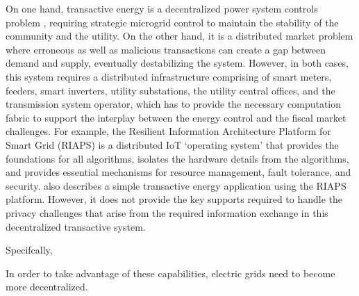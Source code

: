 On one hand, transactive energy is a decentralized power system controls problem \cite{7452738}, requiring strategic microgrid control to maintain the stability of the community and the utility. On the other hand, it is a distributed market problem where erroneous as well as malicious transactions can create a gap between demand and supply, eventually destabilizing the system. However, in both cases, this system requires a distributed  infrastructure comprising of smart meters, feeders, smart inverters, utility substations, the utility central offices, and the transmission system operator, which has to provide the necessary computation fabric to support the interplay between the energy control and the fiscal market challenges. For example, the Resilient Information Architecture Platform for Smart Grid (RIAPS) \cite{eisele2017riaps} is a distributed IoT  `operating system' that provides the foundations for all algorithms, isolates the hardware details from the algorithms, and provides essential mechanisms for resource management, fault tolerance, and security. \cite{Scott2017ICCPS} also describes a simple transactive energy application using the RIAPS platform.
However, it does not provide the key supports required to handle the privacy challenges that arise from the required information exchange in this decentralized transactive system.


Specifcally, 

%






In order to take advantage of these capabilities, electric grids need to become more decentralized.



